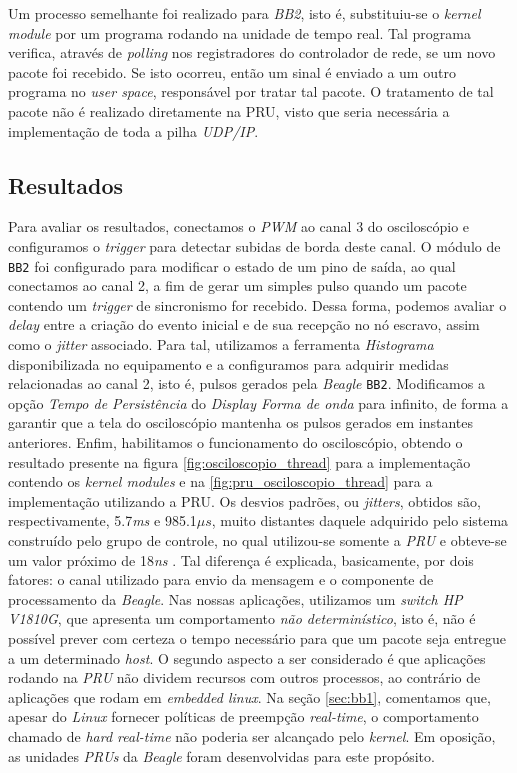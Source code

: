 \vspace{12pt}

Um processo semelhante foi realizado para \textit{BB2}, isto é, substituiu-se o
\textit{kernel module} por um programa rodando na unidade de tempo real. Tal
programa verifica, através de \textit{polling} nos registradores do controlador
de rede, se um novo pacote foi recebido. Se isto ocorreu, então um sinal é
enviado a um outro programa no \textit{user space}, responsável por tratar tal
pacote. O tratamento de tal pacote não é realizado diretamente na PRU, visto que
seria necessária a implementação de toda a pilha \textit{UDP/IP}.

\subsection {Resultados}

Para avaliar os resultados, conectamos o \textit{PWM} ao canal 3 do osciloscópio
e configuramos o \textit{trigger} para detectar subidas de borda deste canal. O
módulo de \texttt{BB2} foi configurado para modificar o estado de um pino de
saída, ao qual conectamos ao canal 2, a fim de gerar um simples pulso quando um
pacote contendo um \textit{trigger} de sincronismo for recebido. Dessa forma,
podemos avaliar o \textit{delay} entre a criação do evento inicial e de sua
recepção no nó escravo, assim como o \textit{jitter} associado. Para tal,
utilizamos a ferramenta \textit{Histograma} disponibilizada no equipamento e a
configuramos para adquirir medidas relacionadas ao canal 2, isto é, pulsos
gerados pela \textit{Beagle} \texttt{BB2}. Modificamos a opção \textit{Tempo de
Persistência} do \textit{Display Forma de onda} para infinito, de forma a
garantir que a tela do osciloscópio mantenha os pulsos gerados em instantes
anteriores. Enfim, habilitamos o funcionamento do osciloscópio, obtendo o
resultado presente na figura \ref{fig:osciloscopio_thread} para a implementação
contendo os \textit{kernel modules} e na \ref{fig:pru_osciloscopio_thread} para
a implementação utilizando a PRU. Os desvios padrões, ou \textit{jitters},
obtidos são, respectivamente, 5.7\textit{ms} e 985.1\(\mu s\), muito distantes
daquele adquirido pelo sistema construído pelo grupo de controle, no qual
utilizou-se somente a \textit{PRU} e obteve-se um valor próximo de
18\textit{ns} \cite{pat}. Tal diferença é explicada, basicamente, por dois
fatores: o canal utilizado para envio da mensagem e o componente de processamento da
\textit{Beagle}. Nas nossas aplicações, utilizamos um \textit{switch HP V1810G},
que apresenta um comportamento \textit{não determinístico}, isto é, não é
possível prever com certeza o tempo necessário para que um pacote seja
entregue a um determinado \textit{host}. O segundo aspecto a ser considerado é
que aplicações rodando na \textit{PRU} não dividem recursos com outros
processos, ao contrário de aplicações que rodam em \textit{embedded linux}. Na
seção \ref{sec:bb1}, comentamos que, apesar do \textit{Linux} fornecer políticas
de preempção \textit{real-time}, o comportamento chamado de \textit{hard
real-time} não poderia ser alcançado pelo \textit{kernel}. Em oposição, as
unidades \textit{PRUs} da \textit{Beagle} foram desenvolvidas para este
propósito.

